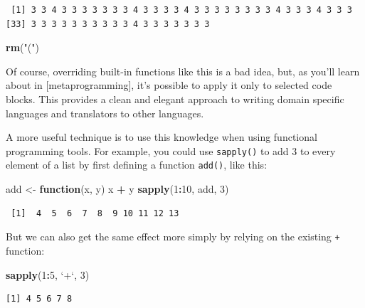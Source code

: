 \documentclass[]{book}
\newenvironment{Shaded}{\begin{snugshade}}{\end{snugshade}}
\newcommand{\ControlFlowTok}[1]{\textcolor[rgb]{0.13,0.29,0.53}{\textbf{#1}}}
\newcommand{\DataTypeTok}[1]{\textcolor[rgb]{0.13,0.29,0.53}{#1}}
\newcommand{\DecValTok}[1]{\textcolor[rgb]{0.00,0.00,0.81}{#1}}
\newcommand{\KeywordTok}[1]{\textcolor[rgb]{0.13,0.29,0.53}{\textbf{#1}}}
\newcommand{\NormalTok}[1]{#1}
\newcommand{\OperatorTok}[1]{\textcolor[rgb]{0.81,0.36,0.00}{\textbf{#1}}}
\newcommand{\StringTok}[1]{\textcolor[rgb]{0.31,0.60,0.02}{#1}}
\theoremstyle{definition}
\theoremstyle{definition}
\theoremstyle{definition}
\theoremstyle{remark}
\begin{document}
\begin{verbatim}
 [1] 3 3 4 3 3 3 3 3 3 3 4 3 3 3 3 4 3 3 3 3 3 3 3 3 4 3 3 3 4 3 3 3
[33] 3 3 3 3 3 3 3 3 3 3 4 3 3 3 3 3 3 3
\end{verbatim}

\begin{Shaded}
\begin{Highlighting}[]
\KeywordTok{rm}\NormalTok{(}\StringTok{"("}\NormalTok{)}
\end{Highlighting}
\end{Shaded}

Of course, overriding built-in functions like this is a bad idea, but,
as you'll learn about in {[}metaprogramming{]}, it's possible to apply
it only to selected code blocks. This provides a clean and elegant
approach to writing domain specific languages and translators to other
languages.

A more useful technique is to use this knowledge when using functional
programming tools. For example, you could use \texttt{sapply()} to add 3
to every element of a list by first defining a function \texttt{add()},
like this:

\begin{Shaded}
\begin{Highlighting}[]
\NormalTok{add <-}\StringTok{ }\ControlFlowTok{function}\NormalTok{(x, y) x }\OperatorTok{+}\StringTok{ }\NormalTok{y}
\KeywordTok{sapply}\NormalTok{(}\DecValTok{1}\OperatorTok{:}\DecValTok{10}\NormalTok{, add, }\DecValTok{3}\NormalTok{)}
\end{Highlighting}
\end{Shaded}

\begin{verbatim}
 [1]  4  5  6  7  8  9 10 11 12 13
\end{verbatim}

But we can also get the same effect more simply by relying on the
existing \texttt{+} function:

\begin{Shaded}
\begin{Highlighting}[]
\KeywordTok{sapply}\NormalTok{(}\DecValTok{1}\OperatorTok{:}\DecValTok{5}\NormalTok{, }\StringTok{`}\DataTypeTok{+}\StringTok{`}\NormalTok{, }\DecValTok{3}\NormalTok{)}
\end{Highlighting}
\end{Shaded}

\begin{verbatim}
[1] 4 5 6 7 8
\end{verbatim}
\end{document}
